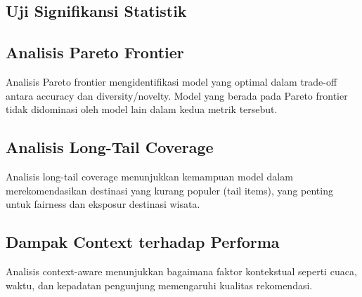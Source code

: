 \subsection{Uji Signifikansi Statistik}



\subsection{Analisis Pareto Frontier}

Analisis Pareto frontier mengidentifikasi model yang optimal dalam trade-off antara accuracy dan diversity/novelty. Model yang berada pada Pareto frontier tidak didominasi oleh model lain dalam kedua metrik tersebut.

\subsection{Analisis Long-Tail Coverage}

Analisis long-tail coverage menunjukkan kemampuan model dalam merekomendasikan destinasi yang kurang populer (tail items), yang penting untuk fairness dan eksposur destinasi wisata.

\subsection{Dampak Context terhadap Performa}

Analisis context-aware menunjukkan bagaimana faktor kontekstual seperti cuaca, waktu, dan kepadatan pengunjung memengaruhi kualitas rekomendasi.

